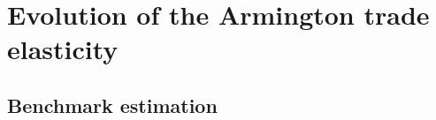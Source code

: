 \documentclass{beamer}
\begin{document}

\section{Evolution of the Armington trade elasticity}
\subsection{Benchmark estimation}
\end{document}
